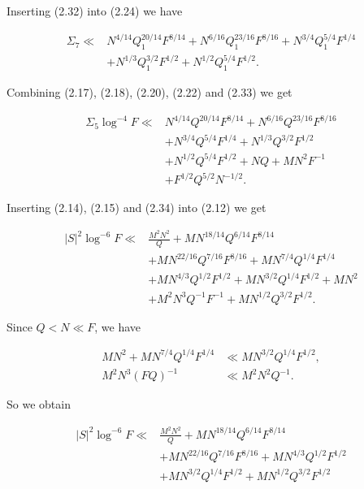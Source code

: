 \documentclass[10pt]{article}
\begin{document}
Inserting (2.32) into (2.24) we have


\begin{align*}
\Sigma_{7} \ll & N^{4 / 14} Q_{1}^{20 / 14} F^{8 / 14}+N^{6 / 16} Q_{1}^{23 / 16} F^{8 / 16}+N^{3 / 4} Q_{1}^{5 / 4} F^{1 / 4}  \tag{2.33}\\
& +N^{1 / 3} Q_{1}^{3 / 2} F^{1 / 2}+N^{1 / 2} Q_{1}^{5 / 4} F^{1 / 2}.
\end{align*}


Combining (2.17), (2.18), (2.20), (2.22) and (2.33) we get


\begin{align*}
\Sigma_{5} \log ^{-4} F \ll & N^{4 / 14} Q^{20 / 14} F^{8 / 14}+N^{6 / 16} Q^{23 / 16} F^{8 / 16}  \tag{2.34}\\
& +N^{3 / 4} Q^{5 / 4} F^{1 / 4}+N^{1 / 3} Q^{3 / 2} F^{1 / 2} \\
& +N^{1 / 2} Q^{5 / 4} F^{1 / 2}+N Q+M N^{2} F^{-1} \\
& +F^{1 / 2} Q^{5 / 2} N^{-1 / 2}.
\end{align*}


Inserting (2.14), (2.15) and (2.34) into (2.12) we get


\begin{align*}
|S|^{2} \log ^{-6} F \ll & \frac{M^{2} N^{2}}{Q}+M N^{18 / 14} Q^{6 / 14} F^{8 / 14}  \tag{2.35}\\
& +M N^{22 / 16} Q^{7 / 16} F^{8 / 16}+M N^{7 / 4} Q^{1 / 4} F^{1 / 4} \\
& +M N^{4 / 3} Q^{1 / 2} F^{1 / 2}+M N^{3 / 2} Q^{1 / 4} F^{1 / 2}+M N^{2} \\
& +M^{2} N^{3} Q^{-1} F^{-1}+M N^{1 / 2} Q^{3 / 2} F^{1 / 2}.
\end{align*}


Since $Q<N \ll F$, we have

$$
\begin{aligned}
M N^{2}+M N^{7 / 4} Q^{1 / 4} F^{1 / 4} & \ll M N^{3 / 2} Q^{1 / 4} F^{1 / 2}, \\
M^{2} N^{3}(F Q)^{-1} & \ll M^{2} N^{2} Q^{-1}.
\end{aligned}
$$

So we obtain


\begin{align*}
|S|^{2} \log ^{-6} F \ll & \frac{M^{2} N^{2}}{Q}+M N^{18 / 14} Q^{6 / 14} F^{8 / 14}  \tag{2.36}\\
& +M N^{22 / 16} Q^{7 / 16} F^{8 / 16}+M N^{4 / 3} Q^{1 / 2} F^{1 / 2} \\
& +M N^{3 / 2} Q^{1 / 4} F^{1 / 2}+M N^{1 / 2} Q^{3 / 2} F^{1 / 2}
\end{align*}
\end{document}
